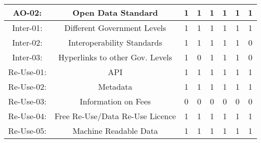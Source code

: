 \documentclass[a4paper, twoside]{report}
\begin{document}
\begin{table}[htbp]
\begin{adjustbox}{max width=\linewidth}
\begin{tabular}{rccccccc}
    \multicolumn{1}{c}{AO-02:} & \multicolumn{1}{p{19em}}{\cellcolor[rgb]{ .749,  .749,  .749}Open Data Standard} & \cellcolor[rgb]{ .749,  .749,  .749}1 & \cellcolor[rgb]{ .749,  .749,  .749}1 & \cellcolor[rgb]{ .749,  .749,  .749}1 & \cellcolor[rgb]{ .749,  .749,  .749}1 & \cellcolor[rgb]{ .749,  .749,  .749}1 & \cellcolor[rgb]{ .749,  .749,  .749}1 \\
    \midrule
    \multicolumn{1}{c}{Inter-01:} & \multicolumn{1}{p{19em}}{Different Government Levels} & 1     & 1     & 1     & 1     & 1     & 1 \\
    \multicolumn{1}{c}{Inter-02:} & \multicolumn{1}{p{19em}}{\cellcolor[rgb]{ .749,  .749,  .749}Interoperability Standards} & \cellcolor[rgb]{ .749,  .749,  .749}1 & \cellcolor[rgb]{ .749,  .749,  .749}1 & \cellcolor[rgb]{ .749,  .749,  .749}1 & \cellcolor[rgb]{ .749,  .749,  .749}1 & \cellcolor[rgb]{ .749,  .749,  .749}1 & \cellcolor[rgb]{ .749,  .749,  .749}0 \\
    \multicolumn{1}{c}{Inter-03:} & \multicolumn{1}{p{19em}}{\cellcolor[rgb]{ .749,  .749,  .749}Hyperlinks to other Gov. Levels} & \cellcolor[rgb]{ .749,  .749,  .749}1 & \cellcolor[rgb]{ .749,  .749,  .749}0 & \cellcolor[rgb]{ .749,  .749,  .749}1 & \cellcolor[rgb]{ .749,  .749,  .749}1 & \cellcolor[rgb]{ .749,  .749,  .749}1 & \cellcolor[rgb]{ .749,  .749,  .749}0 \\
    \midrule
    \multicolumn{1}{c}{Re-Use-01:} & \multicolumn{1}{p{19em}}{API} & 1     & 1     & 1     & 1     & 1     & 1 \\
    \multicolumn{1}{c}{Re-Use-02:} & \multicolumn{1}{p{19em}}{Metadata} & 1     & 1     & 1     & 1     & 1     & 1 \\
    \multicolumn{1}{c}{Re-Use-03:} & \multicolumn{1}{p{19em}}{Information on Fees} & 0     & 0     & 0     & 0     & 0     & 0 \\
    \multicolumn{1}{c}{Re-Use-04:} & \multicolumn{1}{p{19em}}{\cellcolor[rgb]{ .749,  .749,  .749}Free Re-Use/Data Re-Use Licence} & \cellcolor[rgb]{ .749,  .749,  .749}1 & \cellcolor[rgb]{ .749,  .749,  .749}1 & \cellcolor[rgb]{ .749,  .749,  .749}1 & \cellcolor[rgb]{ .749,  .749,  .749}1 & \cellcolor[rgb]{ .749,  .749,  .749}1 & \cellcolor[rgb]{ .749,  .749,  .749}1 \\
    \multicolumn{1}{c}{Re-Use-05:} & \multicolumn{1}{p{19em}}{\cellcolor[rgb]{ .749,  .749,  .749}Machine Readable Data} & \cellcolor[rgb]{ .749,  .749,  .749}1 & \cellcolor[rgb]{ .749,  .749,  .749}1 & \cellcolor[rgb]{ .749,  .749,  .749}1 & \cellcolor[rgb]{ .749,  .749,  .749}1 & \cellcolor[rgb]{ .749,  .749,  .749}1 & \cellcolor[rgb]{ .749,  .749,  .749}1 \\

\end{tabular}
\end{adjustbox}
\end{table}
\end{document}
